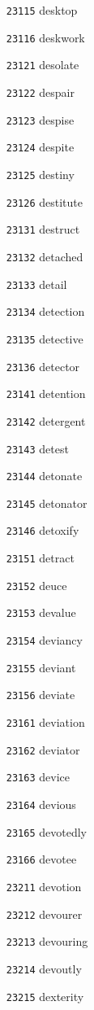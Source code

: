 \documentclass[twoside,11pt]{article}
\begin{document}
\begin{multicols}{5}
\begin{enumerate}
\item[\texttt{23115}] desktop
\item[\texttt{23116}] deskwork
\item[\texttt{23121}] desolate
\item[\texttt{23122}] despair
\item[\texttt{23123}] despise
\item[\texttt{23124}] despite
\item[\texttt{23125}] destiny
\item[\texttt{23126}] destitute
\item[\texttt{23131}] destruct
\item[\texttt{23132}] detached
\item[\texttt{23133}] detail
\item[\texttt{23134}] detection
\item[\texttt{23135}] detective
\item[\texttt{23136}] detector
\item[\texttt{23141}] detention
\item[\texttt{23142}] detergent
\item[\texttt{23143}] detest
\item[\texttt{23144}] detonate
\item[\texttt{23145}] detonator
\item[\texttt{23146}] detoxify
\item[\texttt{23151}] detract
\item[\texttt{23152}] deuce
\item[\texttt{23153}] devalue
\item[\texttt{23154}] deviancy
\item[\texttt{23155}] deviant
\item[\texttt{23156}] deviate
\item[\texttt{23161}] deviation
\item[\texttt{23162}] deviator
\item[\texttt{23163}] device
\item[\texttt{23164}] devious
\item[\texttt{23165}] devotedly
\item[\texttt{23166}] devotee
\item[\texttt{23211}] devotion
\item[\texttt{23212}] devourer
\item[\texttt{23213}] devouring
\item[\texttt{23214}] devoutly
\item[\texttt{23215}] dexterity

\end{enumerate}
\end{multicols}
\end{document}
